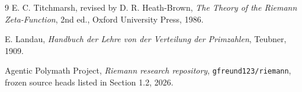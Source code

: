 \documentclass[11pt]{article}
\begin{document}
\begin{thebibliography}{9}
E. C. Titchmarsh, revised by D. R. Heath-Brown,
\emph{The Theory of the Riemann Zeta-Function}, 2nd ed., Oxford University Press, 1986.

E. Landau,
\emph{Handbuch der Lehre von der Verteilung der Primzahlen}, Teubner, 1909.

Agentic Polymath Project,
\emph{Riemann research repository}, \texttt{gfreund123/riemann}, frozen source heads listed in Section 1.2, 2026.
\end{thebibliography}
\end{document}
